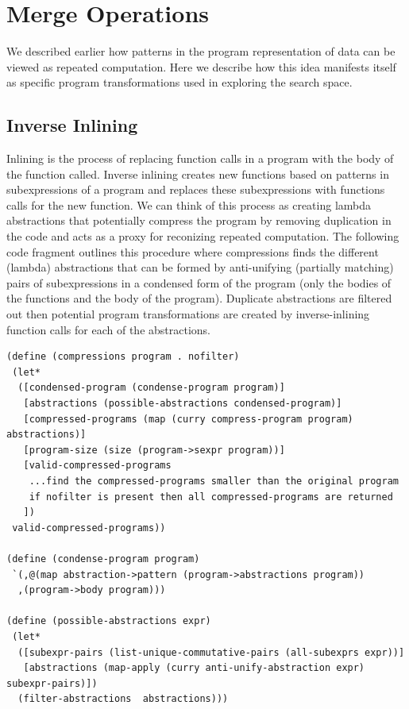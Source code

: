 \documentclass[a4paper,10pt]{article}
\begin{document}
\section{Merge Operations}
We described earlier how patterns in the program representation of data can be viewed as repeated computation.  Here we describe how this idea manifests itself as specific program transformations used in exploring the search space.

\subsection{Inverse Inlining}
Inlining is the process of replacing function calls in a program with the body of the function called.  Inverse inlining creates new functions based on patterns in subexpressions of a program and replaces these subexpressions with functions calls for the new function.  We can think of this process as creating lambda abstractions that potentially compress the program by removing duplication in the code and acts as a proxy for reconizing repeated computation.  The following code fragment outlines this procedure where compressions finds the different (lambda) abstractions that can be formed by anti-unifying (partially matching) pairs of subexpressions in a condensed form of the program (only the bodies of the functions and the body of the program).  Duplicate abstractions are filtered out then potential program transformations are created by inverse-inlining function calls for each of the abstractions.  

\begin{lstlisting}[frame=trBL]
(define (compressions program . nofilter)
 (let* 
  ([condensed-program (condense-program program)]
   [abstractions (possible-abstractions condensed-program)]
   [compressed-programs (map (curry compress-program program) abstractions)]
   [program-size (size (program->sexpr program))]
   [valid-compressed-programs
    ...find the compressed-programs smaller than the original program
    if nofilter is present then all compressed-programs are returned
   ])
 valid-compressed-programs))

(define (condense-program program)
 `(,@(map abstraction->pattern (program->abstractions program))
  ,(program->body program)))

(define (possible-abstractions expr)
 (let* 
  ([subexpr-pairs (list-unique-commutative-pairs (all-subexprs expr))]
   [abstractions (map-apply (curry anti-unify-abstraction expr) subexpr-pairs)])
  (filter-abstractions  abstractions)))
\end{lstlisting}
\end{document}
